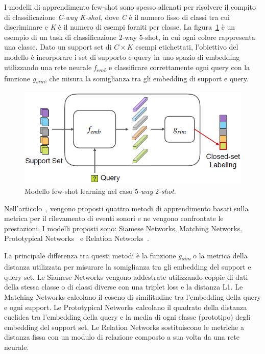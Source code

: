 \documentclass[12pt,a4paper,titlepage]{article}
\begin{document}
I modelli di apprendimento few-shot sono spesso allenati per risolvere il compito di classificazione \textit{C-way K-shot}, dove \textit{C} è il numero fisso di classi tra cui discriminare e \textit{K} è il numero di esempi forniti per classe. La figura~\ref{fig:few-shot_learning_model} è un esempio di un task di classificazione 2-way 5-shot, in cui ogni colore rappresenta una classe. Dato un support set di $C \times K$ esempi etichettati, l'obiettivo del modello è incorporare i set di supporto e query in uno spazio di embedding utilizzando una rete neurale \textit{f\textsubscript{emb}} e classificare correttamente ogni query con la funzione \textit{g\textsubscript{sim}}, che misura la somiglianza tra gli embedding di support e query.

\begin{figure}[h]
	\centering	
	\includegraphics[width=.7\textwidth]{Immagini/few_shot_learning_model}
	\caption{Modello few-shot learning nel caso 5\emph{-way} 2\emph{-shot}.~\cite{Salamon:Few-Shot}}
	\label{fig:few-shot_learning_model}
\end{figure}

Nell'articolo~\cite{Salamon:Few-Shot}, vengono proposti quattro metodi di apprendimento basati sulla metrica per il rilevamento di eventi sonori e ne vengono confrontate le prestazioni. I modelli proposti sono: Siamese Networks, Matching Networks, Prototypical Networks~\cite{snell:prototypical} e Relation Networks~\cite{DBLP:journals/corr/abs-1711-06025}. 

La principale differenza tra questi metodi è la funzione \textit{g\textsubscript{sim}} o la metrica della distanza utilizzata per misurare la somiglianza tra gli embedding del support e query set. Le Siamese Networks vengono addestrate utilizzando coppie di dati della stessa classe o di classi diverse con una triplet loss e la distanza L1. Le Matching Networks calcolano il coseno di similitudine tra l'embedding della query e ogni support. Le Prototypical Networks calcolano il quadrato della distanza euclidea tra l'embedding della query e la media di ogni classe (prototipo) degli embedding del support set. Le Relation Networks sostituiscono le metriche a distanza fissa con un modulo di relazione composto a sua volta da una rete neurale.
\end{document}
